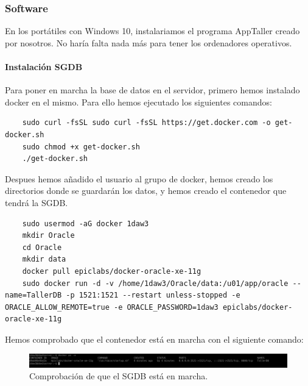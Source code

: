 \documentclass{article}
\begin{document}
\subsubsection{Software}
\label{subsubsection:Software}
{
En los portátiles con Windows 10, instalariamos el programa AppTaller creado por nosotros. No haría falta nada más para tener los ordenadores operativos. \\ 
\paragraph{Instalación SGDB}
Para poner en marcha la base de datos en el servidor, primero hemos instalado docker en el mismo. Para ello hemos ejecutado los siguientes comandos: 
  \begin{lstlisting}
    sudo curl -fsSL sudo curl -fsSL https://get.docker.com -o get-docker.sh
    sudo chmod +x get-docker.sh
    ./get-docker.sh
  \end{lstlisting}
  Despues hemos añadido el usuario al grupo de docker, hemos creado los directorios donde se guardarán 
  los datos, y hemos creado el contenedor que tendrá la SGDB.
  \begin{lstlisting}
    sudo usermod -aG docker 1daw3
    mkdir Oracle
    cd Oracle 
    mkdir data 
    docker pull epiclabs/docker-oracle-xe-11g
    sudo docker run -d -v /home/1daw3/Oracle/data:/u01/app/oracle --name=TallerDB -p 1521:1521 --restart unless-stopped -e ORACLE_ALLOW_REMOTE=true -e ORACLE_PASSWORD=1daw3 epiclabs/docker-oracle-xe-11g
  \end{lstlisting}
  Hemos comprobado que el contenedor está en marcha con el siguiente comando: 
  \begin{figure}[H]
    \centering
    \includegraphics[width=1.0\textwidth]{CapturasSistemas/oracleEnMarcha.PNG}
    \caption{Comprobación de que el SGDB está en marcha.}
  \end{figure}
}
\end{document}
